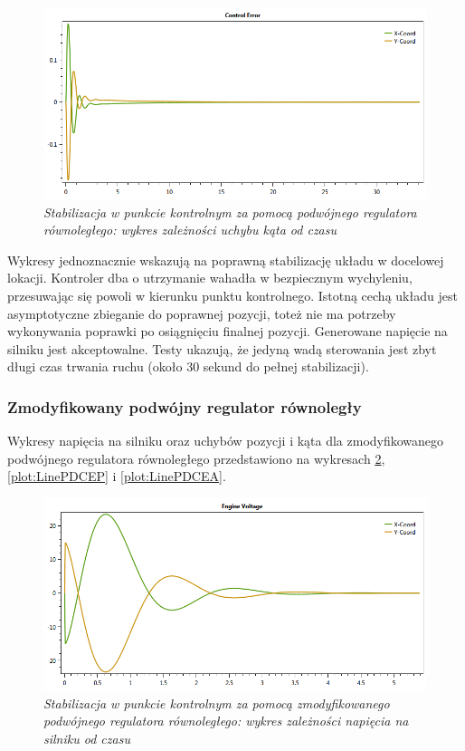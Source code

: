 \documentclass[12pt, twoside, openany]{report}
\theoremstyle{definition}
\begin{document}
\begin{figure}[H]
	\centering
		\includegraphics[width = 350pt]{LinePIDCEA} 
		\caption{\textit{Stabilizacja w punkcie kontrolnym za pomocą podwójnego regulatora równoległego: wykres zależności uchybu kąta od czasu}}
		\label{plot:LinePIDCEA}
\end{figure}

Wykresy jednoznacznie wskazują na poprawną stabilizację układu w docelowej lokacji. Kontroler dba o utrzymanie wahadła w bezpiecznym wychyleniu, przesuwając się powoli w kierunku punktu kontrolnego. Istotną cechą układu jest asymptotyczne zbieganie do poprawnej pozycji, toteż nie ma potrzeby wykonywania poprawki po osiągnięciu finalnej pozycji. Generowane napięcie na silniku jest akceptowalne. Testy ukazują, że jedyną wadą sterowania jest zbyt długi czas trwania ruchu (około 30 sekund do pełnej stabilizacji).

\subsubsection{Zmodyfikowany podwójny regulator równoległy}
Wykresy napięcia na silniku oraz uchybów pozycji i kąta dla zmodyfikowanego podwójnego regulatora równoległego przedstawiono na wykresach \ref{plot:LinePDEV}, \ref{plot:LinePDCEP} i \ref{plot:LinePDCEA}.

\begin{figure}[H]
	\centering
		\includegraphics[width = 350pt]{LinePDEV} 
		\caption{\textit{Stabilizacja w punkcie kontrolnym za pomocą zmodyfikowanego podwójnego regulatora równoległego: wykres zależności napięcia na silniku od czasu}}
		\label{plot:LinePDEV}
\end{figure}
\end{document}
